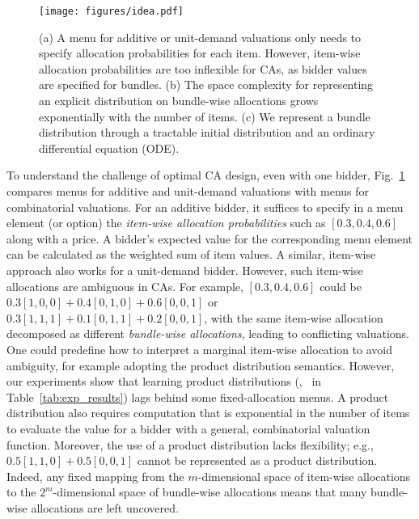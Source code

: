 \begin{figure}
    \centering
    \texttt{[image: figures/idea.pdf]}
    \caption{(a) A menu for additive or unit-demand valuations only needs to specify allocation probabilities for each item. However, item-wise allocation probabilities are  too inflexible
    for CAs, as bidder values are specified for bundles. (b) The space complexity for representing an explicit distribution on bundle-wise allocations grows exponentially with the number of items. (c) We represent a bundle distribution
    through a tractable initial distribution and an ordinary differential equation (ODE). 
    \label{fig:idea}}
\end{figure}
To understand the challenge of optimal CA design, 
%
even with one bidder, 
Fig.~\ref{fig:idea} compares  menus for additive and unit-demand valuations with menus for combinatorial valuations.
For an additive bidder, it suffices to specify in a menu element (or option) the \emph{item-wise allocation probabilities} such as $[0.3, 0.4, 0.6]$ along with a price. A bidder's  expected value for the corresponding menu element can be calculated as the weighted sum of item values. A similar, item-wise  approach also works for a unit-demand bidder.
However, such item-wise allocations are ambiguous in CAs.
For example, $[0.3, 0.4, 0.6]$ could be $0.3[1,0,0]+0.4[0,1,0]+0.6[0,0,1]$ or
$0.3[1,1,1]+0.1[0,1,1]+0.2[0,0,1]$, with the same item-wise allocation  decomposed as different \emph{bundle-wise allocations}, leading to conflicting valuations. One could predefine how to interpret a marginal item-wise allocation to avoid ambiguity, for example adopting the product distribution semantics. However, our experiments show that learning product distributions (\eg, \bundle~in Table~\ref{tab:exp_results})  lags behind some fixed-allocation menus. A product distribution also requires computation that is exponential in the number of items to evaluate the value for a bidder with a general, combinatorial valuation function. 
Moreover, the use of a product distribution lacks flexibility; e.g.,  $0.5[1,1,0]+0.5[0,0,1]$ cannot be represented as a product distribution. Indeed, any fixed mapping from the $m$-dimensional space  of item-wise allocations to the $2^m$-dimensional space of bundle-wise allocations means that many bundle-wise allocations are left uncovered.
